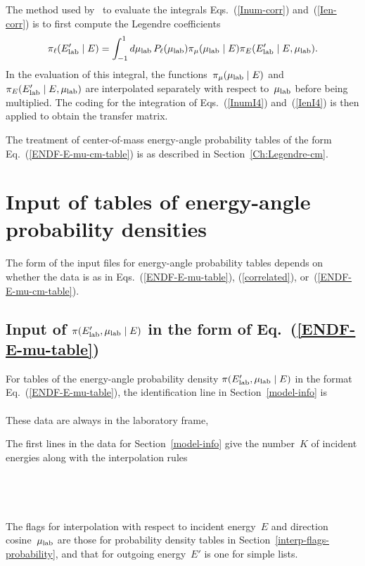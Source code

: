 The method used by \gettransfer\ to evaluate the integrals Eqs.~(\ref{Inum-corr})
and~(\ref{Ien-corr}) is to first compute the Legendre coefficients
\begin{equation}
  \pi_\ell(E_{\text{lab}}' \mid E) =
  \int_{-1}^1 d\mu_{\text{lab}}  \,  P_\ell ( \mu_{\text{lab}} ) \pi_\mu(\mu_{\text{lab}} \mid E)\pi_E(E_{\text{lab}}' \mid E, \mu_{\text{lab}}).
  \label{get-I4}
\end{equation}
In the evaluation of this integral, the functions~$\pi_\mu(\mu_{\text{lab}} \mid E)$
and~$\pi_E(E_{\text{lab}}' \mid E, \mu_{\text{lab}})$ are interpolated separately with respect to~$\mu_{\text{lab}}$
before being multiplied.
The coding for the integration of Eqs.~(\ref{InumI4})
and~(\ref{IenI4}) is then applied to obtain the transfer matrix.

The treatment of center-of-mass energy-angle probability tables
of the form Eq.~(\ref{ENDF-E-mu-cm-table}) is as described in
Section~\ref{Ch:Legendre-cm}.

\section{Input of tables of energy-angle probability densities}
The form of the input files for energy-angle probability tables
depends on whether the data is as in Eqs.~(\ref{ENDF-E-mu-table}),
(\ref{correlated}), or~(\ref{ENDF-E-mu-cm-table}).

\subsection{Input of $\pi(E_{\text{lab}}', \mu_{\text{lab}} \mid E)$ in the form of Eq.~(\ref{ENDF-E-mu-table})}
For tables of the energy-angle probability density $\pi(E_{\text{lab}}', \mu_{\text{lab}} \mid E)$
in the format Eq.~(\ref{ENDF-E-mu-table}), the identification line in
Section~\ref{model-info} is\\
      \\
These data are always in the laboratory frame,\\

The first lines in the data for Section~\ref{model-info} give the number~$K$
of incident energies along with the interpolation rules\\
  \\
  \\
  \\
  \\
The flags for interpolation with respect to incident energy~$E$ and
direction cosine~$\mu_{\text{lab}}$ are those for probability density tables in
Section~\ref{interp-flags-probability}, and that for outgoing energy~$E'$ is
one for simple lists.

